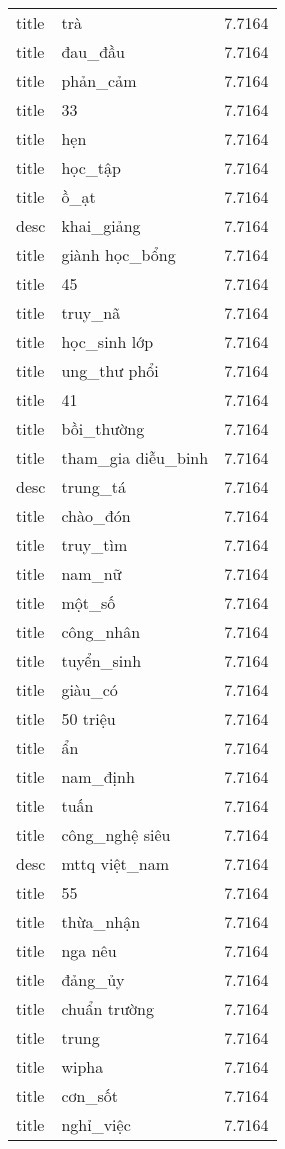 \documentclass{article}
\begin{document}
\begin{tabular}{lll}
title & trà & 7.7164\\
title & đau\_đầu & 7.7164\\
title & phản\_cảm & 7.7164\\
title & 33 & 7.7164\\
title & hẹn & 7.7164\\
title & học\_tập & 7.7164\\
title & ồ\_ạt & 7.7164\\
desc & khai\_giảng & 7.7164\\
title & giành học\_bổng & 7.7164\\
title & 45 & 7.7164\\
title & truy\_nã & 7.7164\\
title & học\_sinh lớp & 7.7164\\
title & ung\_thư phổi & 7.7164\\
title & 41 & 7.7164\\
title & bồi\_thường & 7.7164\\
title & tham\_gia diễu\_binh & 7.7164\\
desc & trung\_tá & 7.7164\\
title & chào\_đón & 7.7164\\
title & truy\_tìm & 7.7164\\
title & nam\_nữ & 7.7164\\
title & một\_số & 7.7164\\
title & công\_nhân & 7.7164\\
title & tuyển\_sinh & 7.7164\\
title & giàu\_có & 7.7164\\
title & 50 triệu & 7.7164\\
title & ẩn & 7.7164\\
title & nam\_định & 7.7164\\
title & tuấn & 7.7164\\
title & công\_nghệ siêu & 7.7164\\
desc & mttq việt\_nam & 7.7164\\
title & 55 & 7.7164\\
title & thừa\_nhận & 7.7164\\
title & nga nêu & 7.7164\\
title & đảng\_ủy & 7.7164\\
title & chuẩn trường & 7.7164\\
title & trung & 7.7164\\
title & wipha & 7.7164\\
title & cơn\_sốt & 7.7164\\
title & nghỉ\_việc & 7.7164\\

\end{tabular}
\end{document}
